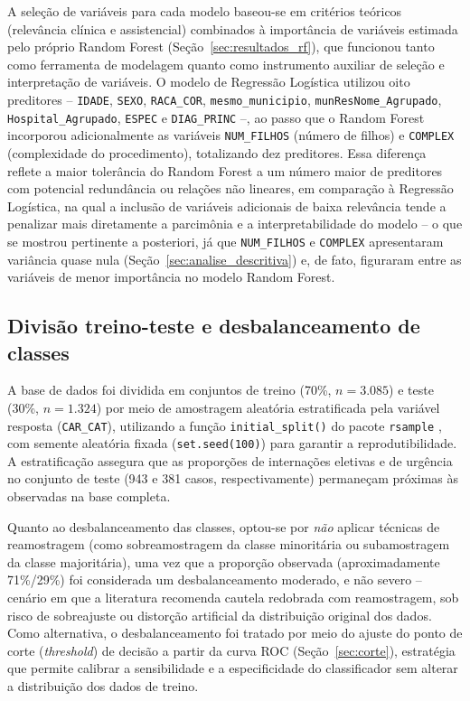 \documentclass[12pt,a4paper]{article}
\begin{document}
A seleção de variáveis para cada modelo baseou-se em critérios teóricos (relevância clínica e assistencial) combinados à importância de variáveis estimada pelo próprio Random Forest (Seção~\ref{sec:resultados_rf}), que funcionou tanto como ferramenta de modelagem quanto como instrumento auxiliar de seleção e interpretação de variáveis. O modelo de Regressão Logística utilizou oito preditores -- \texttt{IDADE}, \texttt{SEXO}, \texttt{RACA\_COR}, \texttt{mesmo\_municipio}, \texttt{munResNome\_Agrupado}, \texttt{Hospital\_Agrupado}, \texttt{ESPEC} e \texttt{DIAG\_PRINC} --, ao passo que o Random Forest incorporou adicionalmente as variáveis \texttt{NUM\_FILHOS} (número de filhos) e \texttt{COMPLEX} (complexidade do procedimento), totalizando dez preditores. Essa diferença reflete a maior tolerância do Random Forest a um número maior de preditores com potencial redundância ou relações não lineares, em comparação à Regressão Logística, na qual a inclusão de variáveis adicionais de baixa relevância tende a penalizar mais diretamente a parcimônia e a interpretabilidade do modelo -- o que se mostrou pertinente a posteriori, já que \texttt{NUM\_FILHOS} e \texttt{COMPLEX} apresentaram variância quase nula (Seção~\ref{sec:analise_descritiva}) e, de fato, figuraram entre as variáveis de menor importância no modelo Random Forest.

\subsection{Divisão treino-teste e desbalanceamento de classes}

A base de dados foi dividida em conjuntos de treino (70\%, $n=3.085$) e teste (30\%, $n=1.324$) por meio de amostragem aleatória estratificada pela variável resposta (\texttt{CAR\_CAT}), utilizando a função \texttt{initial\_split()} do pacote \texttt{rsample} \cite{rsample2024}, com semente aleatória fixada (\texttt{set.seed(100)}) para garantir a reprodutibilidade. A estratificação assegura que as proporções de internações eletivas e de urgência no conjunto de teste (943 e 381 casos, respectivamente) permaneçam próximas às observadas na base completa.

Quanto ao desbalanceamento das classes, optou-se por \emph{não} aplicar técnicas de reamostragem (como sobreamostragem da classe minoritária ou subamostragem da classe majoritária), uma vez que a proporção observada (aproximadamente 71\%/29\%) foi considerada um desbalanceamento moderado, e não severo -- cenário em que a literatura recomenda cautela redobrada com reamostragem, sob risco de sobreajuste ou distorção artificial da distribuição original dos dados. Como alternativa, o desbalanceamento foi tratado por meio do ajuste do ponto de corte (\textit{threshold}) de decisão a partir da curva ROC (Seção~\ref{sec:corte}), estratégia que permite calibrar a sensibilidade e a especificidade do classificador sem alterar a distribuição dos dados de treino.
\end{document}
